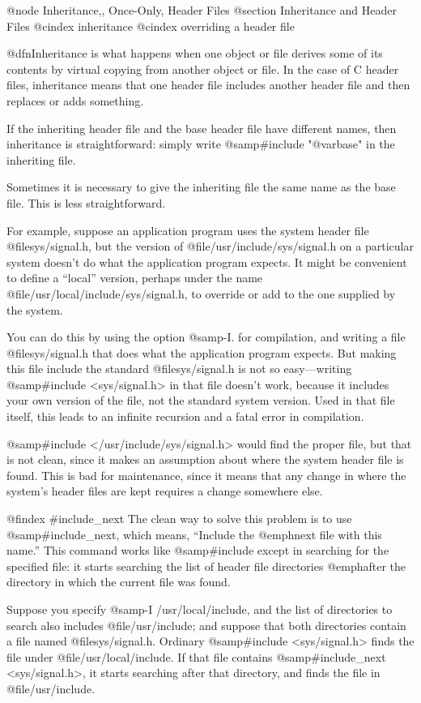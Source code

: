 {@node Inheritance,, Once-Only, Header Files
@section Inheritance and Header Files
@cindex inheritance
@cindex overriding a header file

@dfn{Inheritance} is what happens when one object or file derives some
of its contents by virtual copying from another object or file.  In
the case of C header files, inheritance means that one header file 
includes another header file and then replaces or adds something.

If the inheriting header file and the base header file have different
names, then inheritance is straightforward: simply write @samp{#include
"@var{base}"} in the inheriting file.

Sometimes it is necessary to give the inheriting file the same name as
the base file.  This is less straightforward.

For example, suppose an application program uses the system header file
@file{sys/signal.h}, but the version of @file{/usr/include/sys/signal.h}
on a particular system doesn't do what the application program expects.
It might be convenient to define a ``local'' version, perhaps under the
name @file{/usr/local/include/sys/signal.h}, to override or add to the
one supplied by the system.

You can do this by using the option @samp{-I.} for compilation, and
writing a file @file{sys/signal.h} that does what the application
program expects.  But making this file include the standard
@file{sys/signal.h} is not so easy---writing @samp{#include
<sys/signal.h>} in that file doesn't work, because it includes your own
version of the file, not the standard system version.  Used in that file
itself, this leads to an infinite recursion and a fatal error in
compilation.

@samp{#include </usr/include/sys/signal.h>} would find the proper file,
but that is not clean, since it makes an assumption about where the
system header file is found.  This is bad for maintenance, since it
means that any change in where the system's header files are kept
requires a change somewhere else.

@findex #include_next
The clean way to solve this problem is to use 
@samp{#include_next}, which means, ``Include the @emph{next} file with
this name.''  This command works like @samp{#include} except in
searching for the specified file: it starts searching the list of header
file directories @emph{after} the directory in which the current file
was found.

Suppose you specify @samp{-I /usr/local/include}, and the list of
directories to search also includes @file{/usr/include}; and suppose that
both directories contain a file named @file{sys/signal.h}.  Ordinary
@samp{#include <sys/signal.h>} finds the file under
@file{/usr/local/include}.  If that file contains @samp{#include_next
<sys/signal.h>}, it starts searching after that directory, and finds the
file in @file{/usr/include}.

}
